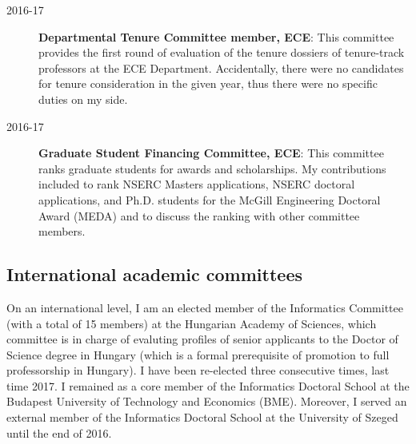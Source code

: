 \begin{description}
\item[2016-17] \textbf{Departmental Tenure Committee member, ECE}: This committee provides the first round of evaluation of the tenure dossiers of tenure-track professors at the ECE Department. Accidentally, there were no candidates for tenure consideration in the given year, thus there were no specific duties on my side. 
\item[2016-17] \textbf{Graduate Student Financing Committee, ECE}: This committee ranks graduate students for awards and scholarships. My contributions included to rank NSERC Masters applications, NSERC doctoral applications, and Ph.D. students for the McGill Engineering Doctoral Award (MEDA) and to discuss the ranking with other committee members.
\end{description}

\subsection{International academic committees}
On an international level, I am an elected member of the Informatics Committee (with a total of 15 members) at the Hungarian Academy of Sciences, which committee is in charge of evaluting profiles of senior applicants to the Doctor of Science degree in Hungary (which is a formal prerequisite of promotion to full professorship in Hungary). I have been re-elected three consecutive times, last time 2017. I remained as a core member of the Informatics Doctoral School at the Budapest University of Technology and Economics (BME). Moreover, I served an external member of the Informatics Doctoral School at the University of Szeged until the end of 2016.


 
